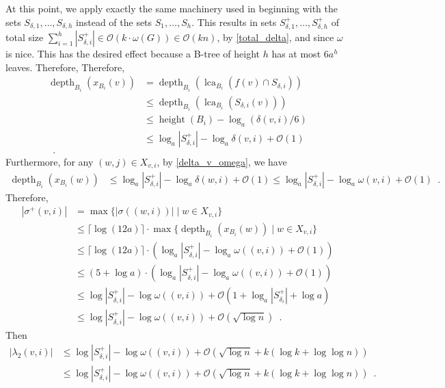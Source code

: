 \documentclass{patmorin}
\let\eqref\cref
\renewcommand{\ge}{\geqslant}
\renewcommand{\le}{\leqslant}
\DeclareMathOperator{\height}{height}
\DeclareMathOperator{\depth}{depth}
\DeclareMathOperator{\lca}{lca}
\newcommand{\Oh}{\calO}
\newcommand{\calO}{\mathcal{O}}
\begin{document}
  At this point, we apply exactly the same  machinery used in \cite{gawrychowski.janczewski:simpler,dujmovic.esperet.ea:adjacency} beginning with the sets $S_{\delta,1},\ldots,S_{\delta,h}$ instead of the sets $S_1,\ldots,S_h$.
  This results in sets $S^+_{\delta,1},\ldots,S^+_{\delta,h}$ of total size $\sum_{i=1}^h |S^+_{\delta,i}|\in \Oh(k\cdot\omega(G))\in \Oh(kn)$, by \eqref{total_delta}, and since $\omega$ is nice.
  This has the desired effect because a B-tree of height $h$ has at most $6a^h$ leaves.  Therefore,
  Therefore,
  \begin{align*}
     \depth_{B_i}(x_{B_i}(v))
     & =
     \depth_{B_i}(\lca_{B_i}(f(v)\cap S_{\delta,i})) \\
     & \le
     \depth_{B_i}(\lca_{B_i}(S_{\delta,i}(v))) \\
     & \le\height(B_i)-\log_a(\delta(v,i)/6)  \\
     & \le \log_a|S^+_{\delta,i}| - \log_a\delta(v,i) + \Oh(1) \\
    \enspace .
  \end{align*}
  Furthermore, for any $(w,j)\in X_{v,i}$, by \eqref{delta_v_omega}, we have
  \begin{align*}
    \depth_{B_i}(x_{B_i}(w))
      & \le \log_a|S^+_{\delta,i}| - \log_a\delta(w,i) + \Oh(1) 
      \le \log_a|S^+_{\delta,i}| - \log_a\omega(v,i) + \Oh(1) \enspace .
  \end{align*}
  Therefore,
  \begin{align*}
     |\sigma^+(v,i)|
      & = \max\{|\sigma((w,i))| \mid w\in X_{v,i}\} \\
      & \le \lceil \log (12a)\rceil\cdot\max\{\depth_{B_i}(x_{B_i}(w)) \mid w\in X_{v,i}\} \\
      & \le \lceil \log (12a)\rceil\cdot (\log_a|S^+_{\delta,i}| - \log_a\omega((v,i)) + \Oh(1)) \\
      & \le (5+ \log a)\cdot (\log_a|S^+_{\delta,i}| - \log_a\omega((v,i)) + \Oh(1)) \\
      & \le \log |S^+_{\delta,i}| - \log\omega((v,i)) + \Oh(1+\log_a |S^+_{\delta_i}| + \log a) \\
      & \le \log |S^+_{\delta,i}| - \log\omega((v,i)) + \Oh(\sqrt{\log n})
      \enspace .
  \end{align*}
  Then
  \begin{align*}
     |\lambda_2(v,i)|
     & \le \log |S^+_{\delta,i}|-\log \omega((v,i)) + \Oh(\sqrt{\log n} + k(\log k+\log\log n)) \\
     & \le \log |S^+_{\delta,i}|-\log \omega((v,i)) + \Oh(\sqrt{\log n} + k(\log k+\log\log n)) \enspace .
  \end{align*}
\end{document}
